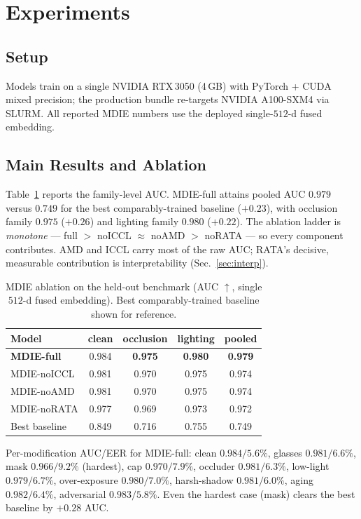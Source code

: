 \documentclass[10pt,conference]{IEEEtran}
\begin{document}
\section{Experiments}
\label{sec:results}

\subsection{Setup}
Models train on a single NVIDIA RTX\,3050 (4\,GB) with PyTorch + CUDA mixed
precision; the production bundle re-targets NVIDIA A100-SXM4 via SLURM. All
reported MDIE numbers use the deployed single-$512$-d fused embedding.

\subsection{Main Results and Ablation}
Table~\ref{tab:ablation} reports the family-level AUC. MDIE-full attains
pooled AUC $0.979$ versus $0.749$ for the best comparably-trained baseline
($+0.23$), with occlusion family $0.975$ ($+0.26$) and lighting family $0.980$
($+0.22$). The ablation ladder is \emph{monotone} ---
full $>$ noICCL $\approx$ noAMD $>$ noRATA --- so every component contributes.
AMD and ICCL carry most of the raw AUC; RATA's decisive, measurable
contribution is interpretability (Sec.~\ref{sec:interp}).

\begin{table}[t]
\centering
\caption{MDIE ablation on the held-out benchmark (AUC $\uparrow$, single
$512$-d fused embedding). Best comparably-trained baseline shown for reference.}
\label{tab:ablation}
\begin{tabular}{lcccc}
\toprule
Model & clean & occlusion & lighting & pooled \\
\midrule
\textbf{MDIE-full}  & 0.984 & \textbf{0.975} & \textbf{0.980} & \textbf{0.979} \\
MDIE-noICCL         & 0.981 & 0.970 & 0.975 & 0.974 \\
MDIE-noAMD          & 0.981 & 0.970 & 0.975 & 0.974 \\
MDIE-noRATA         & 0.977 & 0.969 & 0.973 & 0.972 \\
\midrule
Best baseline       & 0.849 & 0.716 & 0.755 & 0.749 \\
\bottomrule
\end{tabular}
\end{table}

Per-modification AUC/EER for MDIE-full: clean $0.984/5.6\%$, glasses
$0.981/6.6\%$, mask $0.966/9.2\%$ (hardest), cap $0.970/7.9\%$, occluder
$0.981/6.3\%$, low-light $0.979/6.7\%$, over-exposure $0.980/7.0\%$,
harsh-shadow $0.981/6.0\%$, aging $0.982/6.4\%$, adversarial $0.983/5.8\%$.
Even the hardest case (mask) clears the best baseline by $+0.28$ AUC.
\end{document}
